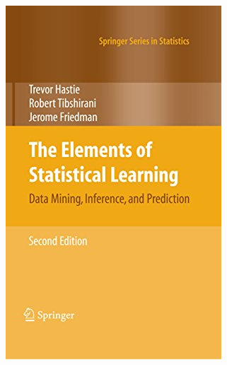 \begin{frame}
\begin{columns}
\begin{column}{0.2\textwidth}  %
    \vspace{-0.5cm}
    \begin{figure}
        \includegraphics[width=\textwidth]{Figures/the_element.jpg}
    \end{figure}
\end{column}
\end{columns}



\end{frame}

